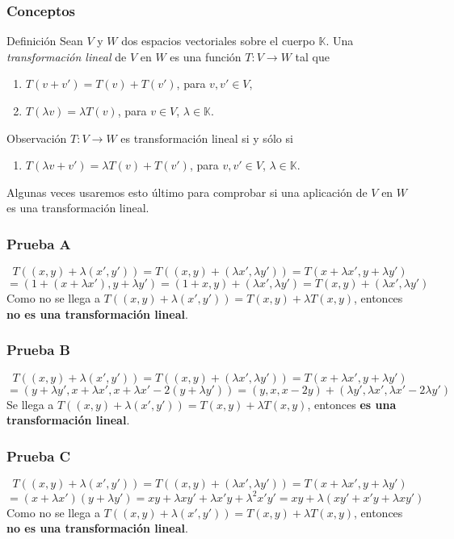 \documentclass[a4paper,12pt]{article}
\begin{document}
\subsubsection{Conceptos}
\begin{defbox}{Definición}
    Sean $V$ y $W$ dos espacios vectoriales sobre el cuerpo $\mathds{K}$. Una \textit{transformación lineal} de $V$ en $W$ es una función $T:V \to W$  tal que
    \begin{enumerate}
        \item $T(v+v') = T(v)+ T(v')$, para $v,v' \in V$,
        \item $T(\lambda v) = \lambda T(v)$, para $v \in V$, $\lambda \in \mathds{K}$.
    \end{enumerate}
\end{defbox}
\begin{obbox}{Observación}
    $T:V \to W$ es transformación lineal si y sólo si
    \begin{enumerate}
        \item $T(\lambda v+v') = \lambda T(v)+ T(v')$, para $v,v' \in V$, $\lambda \in \mathds{K}$.
    \end{enumerate}
    Algunas veces usaremos esto último para comprobar si una aplicación de $V$ en $W$ es una transformación lineal.
\end{obbox}

\subsubsection{Prueba A}
$$
T((x,y)+\lambda(x',y'))=T((x,y)+(\lambda x', \lambda y')) = T (x+\lambda x', y + \lambda y')
$$
$$
= (1+(x+\lambda x'),y + \lambda y') = (1+x, y) + (\lambda x', \lambda y') = T(x,y) + (\lambda x', \lambda y')
$$
Como no se llega a $T((x,y)+\lambda(x',y')) = T(x,y)+\lambda T(x,y)$, entonces \textbf{no es una transformación lineal}.
\subsubsection{Prueba B}
$$
T((x,y)+\lambda(x',y'))=T((x,y)+(\lambda x', \lambda y')) = T (x+\lambda x', y + \lambda y')
$$
$$
= (y + \lambda y', x+\lambda x', x+\lambda x'-2(y + \lambda y')) = (y,x,x-2y) + (\lambda y', \lambda x', \lambda x'-2\lambda y')
$$
Se llega a $T((x,y)+\lambda(x',y')) = T(x,y)+\lambda T(x,y)$, entonces \textbf{es una transformación lineal}.
\subsubsection{Prueba C}
$$
T((x,y)+\lambda(x',y'))=T((x,y)+(\lambda x', \lambda y')) = T (x+\lambda x', y + \lambda y')
$$
$$
= (x+\lambda x')(y + \lambda y') = xy + \lambda xy' + \lambda x'y + \lambda^2 x'y' = xy + \lambda (xy' + x'y + \lambda xy')
$$
Como no se llega a $T((x,y)+\lambda(x',y')) = T(x,y)+\lambda T(x,y)$, entonces \textbf{no es una transformación lineal}.
\end{document}
